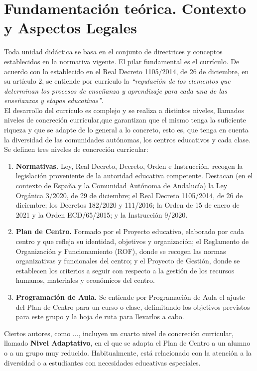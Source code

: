 \documentclass[../main.tex]{book}
\begin{document}
\chapter{Fundamentación teórica. Contexto y Aspectos Legales}


Toda unidad didáctica se basa en el conjunto de directrices y conceptos establecidos en la normativa vigente. El pilar fundamental es el currículo. De acuerdo con lo establecido en el Real Decreto 1105/2014, de 26 de diciembre, en su artículo 2, se entiende por currículo la \textit{``regulación de los elementos que determinan los procesos de enseñanza y aprendizaje para cada una de las enseñanzas y etapas educativas''}. \\

El desarrollo del currículo es complejo y se realiza a distintos niveles, llamados niveles de concreción curricular,que garantizan que el mismo tenga la suficiente riqueza y que se adapte de lo general a lo concreto, esto es, que tenga  en cuenta la diversidad  de las comunidades autónomas, los centros educativos y cada clase. Se definen tres niveles de concreción curricular:

\begin{enumerate}
	\item \textbf{Normativas.} Ley, Real Decreto, Decreto, Orden e Instrucción, recogen la legislación proveniente de la autoridad educativa competente. Destacan (en el contexto de España y la Comunidad Autónoma de Andalucía) la Ley Orgánica 3/2020, de 29 de diciembre; el Real Decreto 1105/2014, de 26 de diciembre; los Decretos 182/2020 y 111/2016; la Orden de 15 de enero de 2021 y la Orden ECD/65/2015; y la Instrucción 9/2020.
	
	\item \textbf{Plan de Centro.} Formado por el Proyecto educativo, elaborado por cada centro y que refleja su identidad, objetivos y organización; el Reglamento de Organización y Funcionamiento (ROF), donde se recogen las normas organizativas y funcionales del centro; y el Proyecto de Gestión, donde se establecen los criterios a seguir con respecto a la gestión de los recursos humanos, materiales y económicos del centro.
	
	\item \textbf{Programación de Aula.} Se entiende por Programación de Aula el ajuste del Plan de Centro para un curso o clase, delimitando los objetivos previstos para este grupo y la hoja de ruta para llevarlos a cabo.
\end{enumerate}

Ciertos autores, como ..., incluyen un cuarto nivel de concreción curricular, llamado \textbf{Nivel Adaptativo}, en el que se adapta el Plan de Centro a un alumno o a un grupo muy reducido. Habitualmente, está relacionado con la atención a la diversidad o a estudiantes con necesidades educativas especiales.
\end{document}
